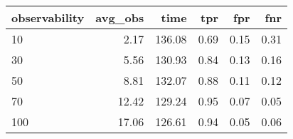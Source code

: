 \begin{tabular}{lrrrrr}
\toprule
observability &  avg\_obs &   time &  tpr &  fpr &  fnr \\
\midrule
           10 &     2.17 & 136.08 & 0.69 & 0.15 & 0.31 \\
           30 &     5.56 & 130.93 & 0.84 & 0.13 & 0.16 \\
           50 &     8.81 & 132.07 & 0.88 & 0.11 & 0.12 \\
           70 &    12.42 & 129.24 & 0.95 & 0.07 & 0.05 \\
          100 &    17.06 & 126.61 & 0.94 & 0.05 & 0.06 \\
\bottomrule
\end{tabular}
